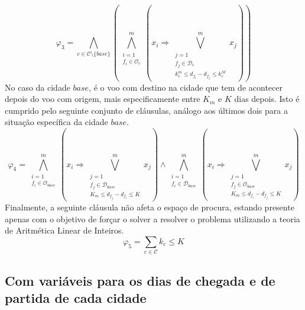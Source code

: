 \documentclass[12pt,a4paper]{article}
\begin{document}
        \begin{equation}
            \varphi_3 =
            \bigwedge_{c \in \mathcal{C} \setminus \{base\}}
            \left(
            \bigwedge_{\substack{i = 1 \\
                                 f_i \in \mathcal{O}_c}}
                     ^{m}
            \left(
            x_i \Rightarrow
            \bigvee_{\substack{j = 1 \\
                               f_j \in \mathcal{D}_c \\
                               k_c^m \leq d_{f_i} - d_{f_j} \leq k_c^M}}
                ^{m}
                {x_j}
            \right)
            \right)
            \label{k_nights}
        \end{equation}
        No caso da cidade $base$, é o voo com destino na cidade que tem de acontecer depois do voo com origem, mais especificamente entre $K_m$ e $K$ dias depois. Isto é cumprido pelo seguinte conjunto de cláusulas, análogo aos últimos dois para a situação específica da cidade $base$.
        \begin{equation}
            \varphi_4 =
            \bigwedge_{\substack{i = 1 \\
                                 f_i \in \mathcal{O}_{base}}}
                     ^{m}
            \left(
            x_i \Rightarrow
            \bigvee_{\substack{j = 1 \\
                               f_j \in \mathcal{D}_{base} \\
                               K_m \leq d_{f_j} - d_{f_i} \leq K}}
                ^{m}
                {x_j}
            \right)
            \land
            \bigwedge_{\substack{i = 1 \\
                                 f_i \in \mathcal{D}_{base}}}
                     ^{m}
            \left(
            x_i \Rightarrow
            \bigvee_{\substack{j = 1 \\
                               f_j \in \mathcal{O}_{base} \\
                               K_m \leq d_{f_i} - d_{f_j} \leq K}}
                ^{m}
                {x_j}
            \right)
            \label{K_nights_base}
        \end{equation}
        Finalmente, a seguinte cláusula não afeta o espaço de procura, estando presente apenas com o objetivo de forçar o solver a resolver o problema utilizando a teoria de Aritmética Linear de Inteiros.
        \begin{equation}
            \varphi_5 =
            \sum_{c \in \mathcal{C}}{k_c} \leq K
            \label{minimize_1}
        \end{equation}
    
    \subsection{Com variáveis para os dias de chegada e de partida de cada cidade}
\end{document}
